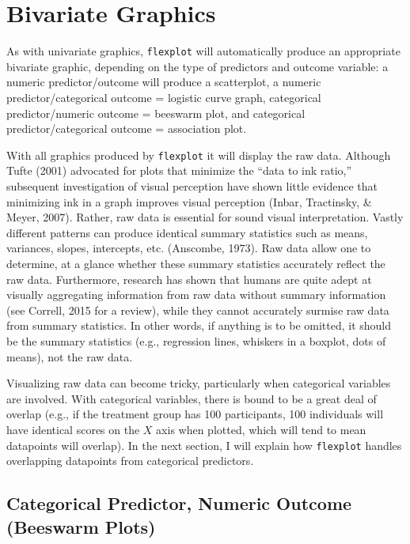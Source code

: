 \documentclass[
  man]{apa6}
\begin{document}
\hypertarget{bivariate-graphics}{%
\section{Bivariate Graphics}\label{bivariate-graphics}}

As with univariate graphics, \texttt{flexplot} will automatically produce an appropriate bivariate graphic, depending on the type of predictors and outcome variable: a numeric predictor/outcome will produce a scatterplot, a numeric predictor/categorical outcome = logistic curve graph, categorical predictor/numeric outcome = beeswarm plot, and categorical predictor/categorical outcome = association plot.

With all graphics produced by \texttt{flexplot} it will display the raw data. Although Tufte (2001) advocated for plots that minimize the ``data to ink ratio,'' subsequent investigation of visual perception have shown little evidence that minimizing ink in a graph improves visual perception (Inbar, Tractinsky, \& Meyer, 2007). Rather, raw data is essential for sound visual interpretation. Vastly different patterns can produce identical summary statistics such as means, variances, slopes, intercepts, etc. (Anscombe, 1973). Raw data allow one to determine, at a glance whether these summary statistics accurately reflect the raw data. Furthermore, research has shown that humans are quite adept at visually aggregating information from raw data without summary information (see Correll, 2015 for a review), while they cannot accurately surmise raw data from summary statistics. In other words, if anything is to be omitted, it should be the summary statistics (e.g., regression lines, whiskers in a boxplot, dots of means), not the raw data.

Visualizing raw data can become tricky, particularly when categorical variables are involved. With categorical variables, there is bound to be a great deal of overlap (e.g., if the treatment group has 100 participants, 100 individuals will have identical scores on the \(X\) axis when plotted, which will tend to mean datapoints will overlap). In the next section, I will explain how \texttt{flexplot} handles overlapping datapoints from categorical predictors.

\hypertarget{categorical-predictor-numeric-outcome-beeswarm-plots}{%
\subsection{Categorical Predictor, Numeric Outcome (Beeswarm Plots)}\label{categorical-predictor-numeric-outcome-beeswarm-plots}}
\end{document}

